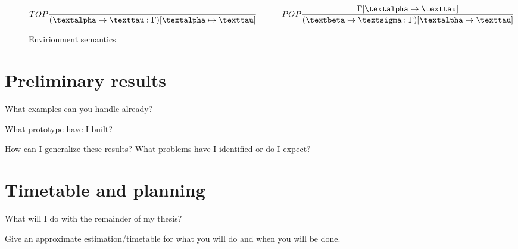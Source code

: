 \documentclass[11pt]{article}
\begin{document}
\begin{figure}[h] 
\hrulefill
\begin{equation*}
TOP\frac{}{(\textalpha \mapsto \texttau : \Gamma) [\textalpha \mapsto \texttau]} 
\quad\quad\quad POP\frac{\Gamma[\textalpha \mapsto \texttau]}{(\textbeta \mapsto \textsigma : \Gamma) [ \textalpha \mapsto \texttau ] }
\end{equation*}
\hrulefill
\caption{Envirionment semantics}
\end{figure}


\section{Preliminary results}

What examples can you handle already? \cite{lampropoulos2017generating}

What prototype have I built? \cite{duregaard2013feat, claessen2010quickspec}

How can I generalize these results? What problems have I identified or
do I expect? \cite{yakushev2009generic}

\section{Timetable and planning}

What will I do with the remainder of my thesis? \cite{claessen2015generating}

Give an approximate estimation/timetable for what you will do and when you will be done.

\newpage
{}

\end{document}
